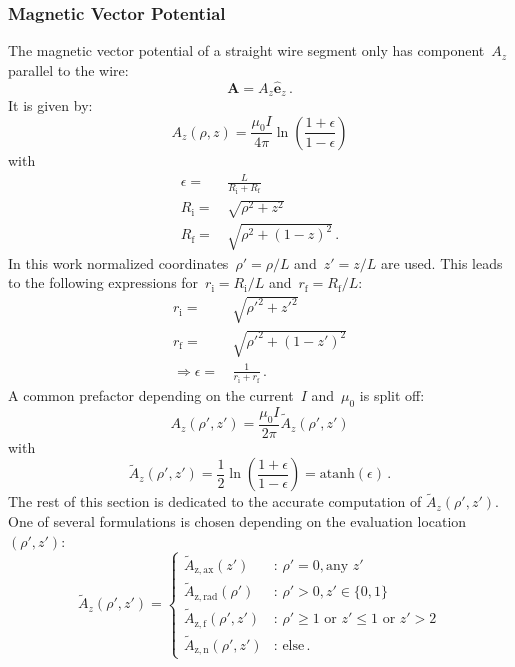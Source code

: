 \subsubsection{Magnetic Vector Potential}
The magnetic vector potential of a straight wire segment
only has component~$A_z$ parallel to the wire:
\begin{equation}
 \mathbf{A} = A_z \hat{\mathbf{e}}_z \, .
\end{equation}
It is given by:
\begin{equation}
  A_z(\rho, z) = \frac{\mu_0 I}{4 \pi} \ln \left( \frac{1 + \epsilon}{1 - \epsilon} \right)
\end{equation}
with
\begin{align}
  \epsilon =&\, \frac{L}{R_\mathrm{i} + R_\mathrm{f}} \\
       R_\mathrm{i} =&\, \sqrt{\rho^2 + z^2} \\
       R_\mathrm{f} =&\, \sqrt{\rho^2 + (1 - z)^2} \, .
\end{align}
In this work normalized coordinates~$\rho' = \rho/L$ and~$z' = z/L$ are used.
This leads to the following expressions
for~$r_\mathrm{i} = R_\mathrm{i}/L$ and~$r_\mathrm{f} = R_\mathrm{f}/L$:
\begin{align}
  r_\mathrm{i} =&\, \sqrt{{\rho'}^2 +      {z'}^2 }       \label{eqn:r_i_default} \\
  r_\mathrm{f} =&\, \sqrt{{\rho'}^2 + (1 - {z'})^2}       \label{eqn:r_f_default} \\
  \Rightarrow
  \epsilon     =&\, \frac{1}{r_\mathrm{i} + r_\mathrm{f}} \label{eqn:eps_default}\, .
\end{align}
A common prefactor depending on the current~$I$ and~$\mu_0$ is split off:
\begin{equation}
  A_z(\rho', z') = \frac{\mu_0 I}{2 \pi} \tilde{A}_z (\rho', z')
\end{equation}
with
\begin{equation}
  \tilde{A}_z (\rho', z')
  = \frac{1}{2} \ln \left( \frac{1 + \epsilon}{1 - \epsilon} \right)
  = \textrm{atanh} (\epsilon) \, . \label{eqn:A_z_tilde}
\end{equation}
The rest of this section is dedicated to the accurate computation of $\tilde{A}_z (\rho', z')$.
One of several formulations is chosen depending on the evaluation location~$(\rho', z')$:
\begin{equation}
  \tilde{A}_z (\rho', z') =
  \begin{cases}
    \tilde{A}_\mathrm{z,ax}  (z')        &:\, \rho' = 0 , \textrm{any } z'      \\
    \tilde{A}_\mathrm{z,rad} (\rho')     &:\, \rho' > 0, z' \in \{0, 1\} \\
    \tilde{A}_\mathrm{z,f}   (\rho', z') &:\, \rho' \geq 1 \textrm{ or } z' \leq 1 \textrm{ or } z' > 2 \\
    \tilde{A}_\mathrm{z,n}   (\rho', z') &:\, \textrm{else} \, .
  \end{cases}
\end{equation}
